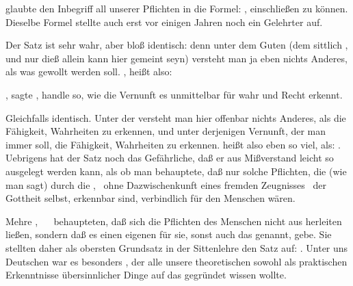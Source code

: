 \begin{aufza}\setcounter{enumi}{2}
\item {} glaubte den Inbegriff all unserer Pflichten in die Formel: , einschließen zu können. Dieselbe Formel stellte auch erst vor einigen Jahren noch ein Gelehrter auf.
\end{aufza}\par
Der Satz ist sehr wahr, aber bloß identisch: denn unter dem Guten (dem sittlich , und nur dieß allein kann hier gemeint seyn) versteht man ja eben nichts Anderes, als was gewollt werden soll. , heißt also: 
\begin{aufza}\setcounter{enumi}{3}
\item {}, sagte , handle so, wie die Vernunft es unmittelbar für wahr und Recht erkennt.
\end{aufza}\par
Gleichfalls identisch. Unter der  versteht man hier offenbar nichts Anderes, als die Fähigkeit, Wahrheiten zu erkennen, und unter derjenigen Vernunft, der man immer  soll, die Fähigkeit,  Wahrheiten zu erkennen.  heißt also eben so viel, als: . Uebrigens hat der Satz noch das Gefährliche, daß er aus Mißverstand leicht so ausgelegt werden kann, als ob man behauptete, daß nur solche Pflichten, die (wie man sagt) durch die , \dh\ ohne Dazwischenkunft eines fremden Zeugnisses \zB\ der Gottheit selbst, erkennbar sind, verbindlich für den Menschen wären.
\begin{aufza}\setcounter{enumi}{4}
\item Mehre , \zB\  \uA\ behaupteten, daß sich die Pflichten des Menschen nicht aus  herleiten ließen, sondern daß es einen eigenen  für sie, sonst auch das  genannt, gebe. Sie stellten daher als obersten Grundsatz in der Sittenlehre den Satz auf: . Unter uns Deutschen war es besonders , der alle unsere theoretischen sowohl als praktischen Erkenntnisse übersinnlicher Dinge auf das  gegründet wissen wollte.
\end{aufza}\par
